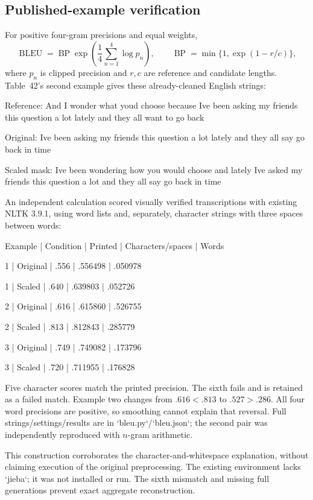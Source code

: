 \documentclass[10pt]{article}
\begin{document}
\subsection*{Published-example verification}
For positive four-gram precisions and equal weights, \[\operatorname{BLEU}=\operatorname{BP}
 \exp\left(\frac14\sum_{n=1}^4\log p_n\right),\qquad
 \operatorname{BP}=\min\{1,\exp(1-r/c)\},\] where \(p_n\) is clipped precision and \(r,c\) are reference and candidate lengths. Table 42’s second example gives these already-cleaned English strings:\par
Reference: And I wonder what youd choose because Ive been asking my friends this question a lot lately and they all want to go back\par
Original: Ive been asking my friends this question a lot lately and they all say go back in time\par
Scaled mask: Ive been wondering how you would choose and lately Ive asked my friends this question a lot and they all say go back in time\par
An independent calculation scored visually verified transcriptions with existing NLTK 3.9.1, using word lists and, separately, character strings with three spaces between words:\par
Example | Condition | Printed | Characters/spaces | Words\par
1 | Original | .556 | .556498 | .050978\par
1 | Scaled | .640 | .639803 | .052726\par
2 | Original | .616 | .615860 | .526755\par
2 | Scaled | .813 | .812843 | .285779\par
3 | Original | .749 | .749082 | .173796\par
3 | Scaled | .720 | .711955 | .176828\par
Five character scores match the printed precision. The sixth fails and is retained as a failed match. Example two changes from \(.616<.813\) to \(.527>.286\). All four word precisions are positive, so smoothing cannot explain that reversal. Full strings/settings/results are in `bleu.py`/`bleu.json`; the second pair was independently reproduced with \(n\)-gram arithmetic.\par
This construction corroborates the character-and-whitespace explanation, without claiming execution of the original preprocessing. The existing environment lacks `jieba`; it was not installed or run. The sixth mismatch and missing full generations prevent exact aggregate reconstruction.\par
\end{document}
